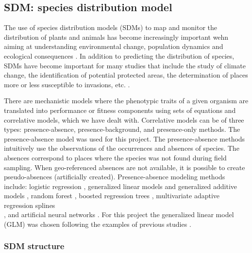 \documentclass[12pt,a4paper]{article}
\begin{document}
\subsection{SDM: species distribution model} 
The use of species distribution models (SDMs) to map and monitor the distribution of plants and animals has become increasingly important wehn aiming at understanding environmental change, population dynamics and ecological consequences \citep{mil}.
In addition to predicting the distribution of species, SDMs have become important for many studies that include the study of climate change, the identification of potential protected areas, the determination of places more or less susceptible to invasions, etc. \citep{mil}.

There are mechanistic models where the phenotypic traits of a given organism are translated into performance or fitness components using sets of equations and correlative models, which we have dealt with.
Correlative models can be of three types: presence-absence, presence-background, and presence-only methods.
The presence-absence model was used for this project.
The presence-absence methods intuitively use the observations of the occurrences and absences of species. The absences correspond to places where the species was not found during field sampling. When geo-referenced absences are not available, it is possible to create pseudo-absences (artificially created).
Presence-absence modeling methods include: logistic regression \citep{bri}, generalized linear models and generalized additive models \citep{guis}, random forest \citep{brei}, boosted regression trees \citep{Eli}, multivariate adaptive regression splines \\ \citep{mois}, and artificial neural networks \citep{tarr}.
 For this project the generalized linear model (GLM) was chosen following the examples of previous studies\citep{eng} \citep{you} .
\subsubsection{SDM structure}
\end{document}
